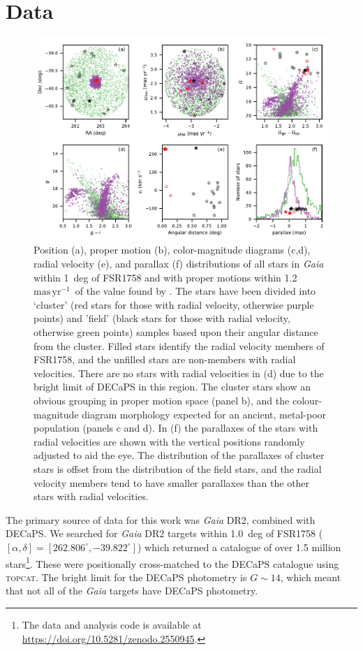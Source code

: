 \documentclass[fleqn,usenatbib]{mnras}
\newcommand{\masyr}{~\ensuremath{\textrm{mas}\,\textrm{yr}^{-1}}}
\begin{document}
\section{Data}\label{sec:data}
\begin{figure}
\includegraphics[width=\textwidth]{figures/cmd.pdf}
\caption{Position (a), proper motion (b), color-magnitude diagrams (c,d), radial velocity (e), and parallax (f) distributions of all stars in \textit{Gaia} within 1~deg of FSR1758 and with proper motions within 1.2~\masyr\ of the value found by . The stars have been divided into `cluster' (red stars for those with radial velocity, otherwise purple points) and 'field' (black stars for those with radial velocity, otherwise green points) samples based upon their angular distance from the cluster. Filled stars identify the radial velocity members of FSR1758, and the unfilled stars are non-members with radial velocities. There are no stars with radial velocities in (d) due to the bright limit of DECaPS in this region. The cluster stars show an obvious grouping in proper motion space (panel b), and the colour-magnitude diagram morphology expected for an ancient, metal-poor population (panels c and d). In (f) the parallaxes of the stars with radial velocities are shown with the vertical positions randomly adjusted to aid the eye. The distribution of the parallaxes of cluster stars is offset from the distribution of the field stars, and the radial velocity members tend to have smaller parallaxes than the other stars with radial velocities.}
\label{fig:cmd}
\end{figure}

The primary source of data for this work was \textit{Gaia} DR2, combined with DECaPS. We searched for \textit{Gaia} DR2 targets within 1.0~deg of FSR1758 ($[\alpha,\delta]=[262.806^\circ,-39.822^\circ]$) which returned a catalogue of over 1.5 million stars\footnote{The data and analysis code is available at \url{https://doi.org/10.5281/zenodo.2550945}.}. These were positionally cross-matched to the DECaPS catalogue using \textsc{topcat}. The bright limit for the DECaPS photometry is $G\sim14$, which meant that not all of the \textit{Gaia} targets have DECaPS photometry.
\end{document}

